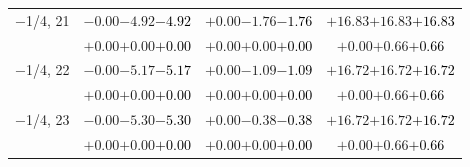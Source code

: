 \documentclass[compress]{beamer}
\begin{document}
\begin{frame}
\begin{tabular}{r | c | c | c}
$-$1/4, 21 & $-0.00$\hspace{0.1 cm}$-4.92$\hspace{0.1 cm}\textcolor{black}{$-4.92$} & $+0.00$\hspace{0.1 cm}$-1.76$\hspace{0.1 cm}\textcolor{black}{$-1.76$} & $+16.83$\hspace{0.1 cm}$+16.83$\hspace{0.1 cm}\textcolor{black}{$+16.83$} \\
           & $+0.00$\hspace{0.1 cm}$+0.00$\hspace{0.1 cm}\textcolor{black}{$+0.00$} & $+0.00$\hspace{0.1 cm}$+0.00$\hspace{0.1 cm}\textcolor{black}{$+0.00$} & $+0.00$\hspace{0.1 cm}$+0.66$\hspace{0.1 cm}\textcolor{black}{$+0.66$} \\
$-$1/4, 22 & $-0.00$\hspace{0.1 cm}$-5.17$\hspace{0.1 cm}\textcolor{black}{$-5.17$} & $+0.00$\hspace{0.1 cm}$-1.09$\hspace{0.1 cm}\textcolor{black}{$-1.09$} & $+16.72$\hspace{0.1 cm}$+16.72$\hspace{0.1 cm}\textcolor{black}{$+16.72$} \\
           & $+0.00$\hspace{0.1 cm}$+0.00$\hspace{0.1 cm}\textcolor{black}{$+0.00$} & $+0.00$\hspace{0.1 cm}$+0.00$\hspace{0.1 cm}\textcolor{black}{$+0.00$} & $+0.00$\hspace{0.1 cm}$+0.66$\hspace{0.1 cm}\textcolor{black}{$+0.66$} \\
$-$1/4, 23 & $-0.00$\hspace{0.1 cm}$-5.30$\hspace{0.1 cm}\textcolor{black}{$-5.30$} & $+0.00$\hspace{0.1 cm}$-0.38$\hspace{0.1 cm}\textcolor{black}{$-0.38$} & $+16.72$\hspace{0.1 cm}$+16.72$\hspace{0.1 cm}\textcolor{black}{$+16.72$} \\
           & $+0.00$\hspace{0.1 cm}$+0.00$\hspace{0.1 cm}\textcolor{black}{$+0.00$} & $+0.00$\hspace{0.1 cm}$+0.00$\hspace{0.1 cm}\textcolor{black}{$+0.00$} & $+0.00$\hspace{0.1 cm}$+0.66$\hspace{0.1 cm}\textcolor{black}{$+0.66$} \\

\end{tabular}
\end{frame}
\end{document}
